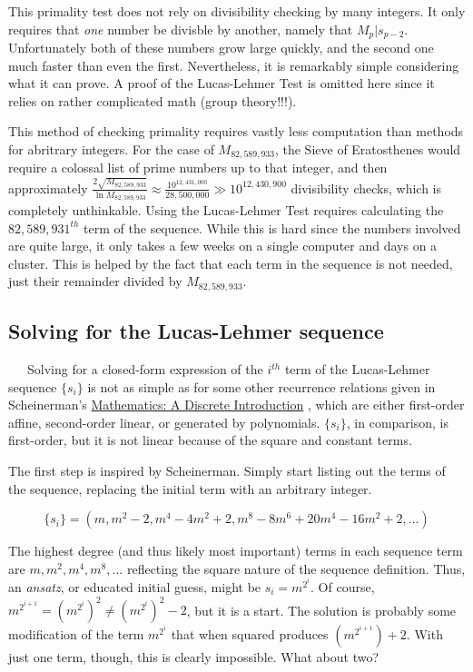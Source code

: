 \documentclass[10pt, oneside]{article}
\newcommand{\entab}{\,\,\,\,\,\,\,\,\,}
\begin{document}
This primality test does not rely on divisibility checking by many integers. It only requires that \emph{one} number be divisble by another, namely that $M_p | s_{p-2}$. Unfortunately both of these numbers grow large quickly, and the second one much faster than even the first. Nevertheless, it is remarkably simple considering what it can prove. A proof of the Lucas-Lehmer Test is omitted here since it relies on rather complicated math (group theory!!!). %

This method of checking primality requires vastly less computation than methods for abritrary integers. For the case of $M_{82,589,933}$, the Sieve of Eratosthenes would require a colossal list of prime numbers up to that integer, and then approximately $\frac{2\sqrt{M_{82,589,933}}}{\ln M_{82,589,933}} \approx \frac{10^{12,431,000}}{28,500,000} \gg 10^{12,430,900}$ divisibility checks, which is completely unthinkable. Using the Lucas-Lehmer Test requires calculating the $82,589,931^{th}$ term of the sequence. While this is hard since the numbers involved are quite large, it only takes a few weeks on a single computer and days on a cluster. This is helped by the fact that each term in the sequence is not needed, just their remainder divided by $M_{82,589,933}$.


\subsection{Solving for the Lucas-Lehmer sequence}

\entab Solving for a closed-form expression of the $i^{th}$ term of the Lucas-Lehmer sequence $\{s_i\}$ is not as simple as for some other recurrence relations given in Scheinerman's \underline{Mathematics: A Discrete Introduction} \cite{textbook}, which are either first-order affine, second-order linear, or generated by polynomials. $\{s_i\}$, in comparison, is first-order, but it is not linear because of the square and constant terms. 

The first step is inspired by Scheinerman. Simply start listing out the terms of the sequence, replacing the initial term with an arbitrary integer.
    
    \[\{s_i\} = (m, m^2 - 2, m^4 - 4m^2 + 2, m^8 - 8m^6 + 20m^4 - 16m^2 + 2, \hdots)\]

The highest degree (and thus likely most important) terms in each sequence term are $m, m^2, m^4, m^8, \hdots$ reflecting the square nature of the sequence definition. Thus, an \emph{ansatz}, or educated initial guess, might be $s_i = m^{2^i}$. Of course, $m^{2^{i+1}} = (m^{2^i})^2 \neq (m^{2^i})^2 - 2$, but it is a start. The solution is probably some modification of the term $m^{2^i}$ that when squared produces $(m^{2^{i+1}}) + 2$. With just one term, though, this is clearly impossible. What about two?
    
\end{document}
